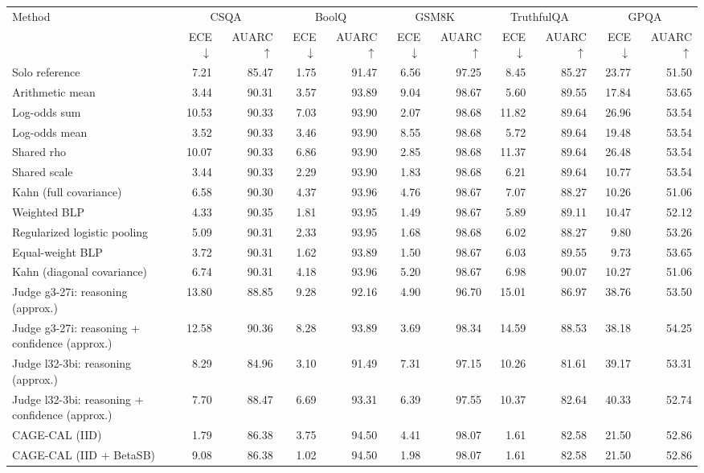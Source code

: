 \begin{tabular}{lrrrrrrrrrr}
\toprule
Method & \multicolumn{2}{c}{CSQA} & \multicolumn{2}{c}{BoolQ} & \multicolumn{2}{c}{GSM8K} & \multicolumn{2}{c}{TruthfulQA} & \multicolumn{2}{c}{GPQA} \\
 & ECE $\downarrow$ & AUARC $\uparrow$ & ECE $\downarrow$ & AUARC $\uparrow$ & ECE $\downarrow$ & AUARC $\uparrow$ & ECE $\downarrow$ & AUARC $\uparrow$ & ECE $\downarrow$ & AUARC $\uparrow$ \\
\midrule
Solo reference & 7.21 & 85.47 & 1.75 & 91.47 & 6.56 & 97.25 & 8.45 & 85.27 & 23.77 & 51.50 \\
Arithmetic mean & 3.44 & 90.31 & 3.57 & 93.89 & 9.04 & 98.67 & 5.60 & 89.55 & 17.84 & 53.65 \\
Log-odds sum & 10.53 & 90.33 & 7.03 & 93.90 & 2.07 & 98.68 & 11.82 & 89.64 & 26.96 & 53.54 \\
Log-odds mean & 3.52 & 90.33 & 3.46 & 93.90 & 8.55 & 98.68 & 5.72 & 89.64 & 19.48 & 53.54 \\
Shared rho & 10.07 & 90.33 & 6.86 & 93.90 & 2.85 & 98.68 & 11.37 & 89.64 & 26.48 & 53.54 \\
Shared scale & 3.44 & 90.33 & 2.29 & 93.90 & 1.83 & 98.68 & 6.21 & 89.64 & 10.77 & 53.54 \\
Kahn (full covariance) & 6.58 & 90.30 & 4.37 & 93.96 & 4.76 & 98.67 & 7.07 & 88.27 & 10.26 & 51.06 \\
Weighted BLP & 4.33 & 90.35 & 1.81 & 93.95 & 1.49 & 98.67 & 5.89 & 89.11 & 10.47 & 52.12 \\
Regularized logistic pooling & 5.09 & 90.31 & 2.33 & 93.95 & 1.68 & 98.68 & 6.02 & 88.27 & 9.80 & 53.26 \\
Equal-weight BLP & 3.72 & 90.31 & 1.62 & 93.89 & 1.50 & 98.67 & 6.03 & 89.55 & 9.73 & 53.65 \\
Kahn (diagonal covariance) & 6.74 & 90.31 & 4.18 & 93.96 & 5.20 & 98.67 & 6.98 & 90.07 & 10.27 & 51.06 \\
Judge g3-27i: reasoning (approx.) & 13.80 & 88.85 & 9.28 & 92.16 & 4.90 & 96.70 & 15.01 & 86.97 & 38.76 & 53.50 \\
Judge g3-27i: reasoning + confidence (approx.) & 12.58 & 90.36 & 8.28 & 93.89 & 3.69 & 98.34 & 14.59 & 88.53 & 38.18 & 54.25 \\
Judge l32-3bi: reasoning (approx.) & 8.29 & 84.96 & 3.10 & 91.49 & 7.31 & 97.15 & 10.26 & 81.61 & 39.17 & 53.31 \\
Judge l32-3bi: reasoning + confidence (approx.) & 7.70 & 88.47 & 6.69 & 93.31 & 6.39 & 97.55 & 10.37 & 82.64 & 40.33 & 52.74 \\
CAGE-CAL (IID) & 1.79 & 86.38 & 3.75 & 94.50 & 4.41 & 98.07 & 1.61 & 82.58 & 21.50 & 52.86 \\
CAGE-CAL (IID + BetaSB) & 9.08 & 86.38 & 1.02 & 94.50 & 1.98 & 98.07 & 1.61 & 82.58 & 21.50 & 52.86 \\
\bottomrule
\end{tabular}
